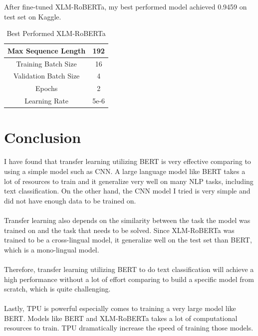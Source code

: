 \documentclass[11pt,a4paper]{article}
\begin{document}
\noindent After fine-tuned XLM-RoBERTa, my best performed model achieved 0.9459 on test set on Kaggle.

\begin{table}[!htbp]
	\centering
	\begin{tabular}{|c|c|}
		\hline
		{Max Sequence Length}   & 192  \\ \hline
		{Training Batch Size}   & 16   \\ \hline
		{Validation Batch Size} & 4    \\ \hline
		{Epochs}                & 2    \\ \hline
		{Learning Rate}         & 5e-6 \\ \hline
	\end{tabular}
	\caption{\label{table:my-label} Best Performed XLM-RoBERTa}
\end{table}


\section{Conclusion}

I have found that transfer learning utilizing BERT is very effective comparing to using a simple model such as CNN. A large language model like BERT takes a lot of resources to train and it generalize very well on many NLP tasks, including text classification. On the other hand, the CNN model I tried is very simple and did not have enough data to be trained on.\\
\\
Transfer learning also depends on the similarity between the task the model was trained on and the task that needs to be solved. Since XLM-RoBERTa was trained to be a cross-lingual model, it generalize well on the test set than BERT, which is a mono-lingual model.\\
\\
Therefore, transfer learning utilizing BERT to do text classification will achieve a high performance without a lot of effort comparing to build a specific model from scratch, which is quite challenging.\\
\\
Lastly, TPU is powerful especially comes to training a very large model like BERT. Models like BERT and XLM-RoBERTa takes a lot of computational resources to train. TPU dramatically increase the speed of training those models.\\


\newpage
\

\end{document}
